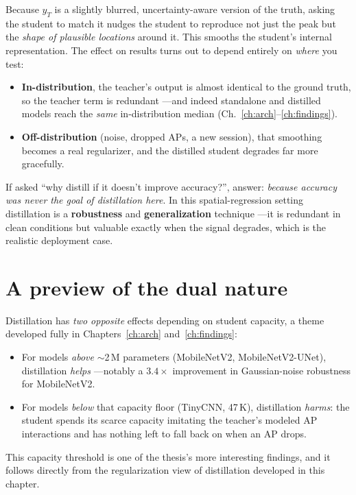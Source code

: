 Because $y_T$ is a slightly blurred, uncertainty-aware version of the truth, asking the student to
match it nudges the student to reproduce not just the peak but the \emph{shape of plausible
locations} around it. This smooths the student's internal representation. The effect on results turns
out to depend entirely on \emph{where} you test:
\begin{itemize}[leftmargin=1.4em,nosep]
  \item \textbf{In-distribution}, the teacher's output is almost identical to the ground truth, so the
  teacher term is redundant ---and indeed standalone and distilled models reach the \emph{same}
  in-distribution median (Ch.~\ref{ch:arch}--\ref{ch:findings}).
  \item \textbf{Off-distribution} (noise, dropped APs, a new session), that smoothing becomes a real
  regularizer, and the distilled student degrades far more gracefully.
\end{itemize}

\begin{defensetip}
If asked ``why distill if it doesn't improve accuracy?'', answer: \emph{because accuracy was never the
goal of distillation here}. In this spatial-regression setting distillation is a \textbf{robustness}
and \textbf{generalization} technique ---it is redundant in clean conditions but valuable exactly when
the signal degrades, which is the realistic deployment case.
\end{defensetip}

\section{A preview of the dual nature}
\label{sec:distill:dual}

Distillation has \emph{two opposite} effects depending on student capacity, a theme developed fully in
Chapters~\ref{ch:arch} and~\ref{ch:findings}:
\begin{itemize}[leftmargin=1.4em,nosep]
  \item For models \emph{above} $\sim$2\,M parameters (MobileNetV2, MobileNetV2-UNet), distillation
  \emph{helps} ---notably a $3.4\times$ improvement in Gaussian-noise robustness for MobileNetV2.
  \item For models \emph{below} that capacity floor (TinyCNN, 47\,K), distillation \emph{harms}: the
  student spends its scarce capacity imitating the teacher's modeled AP interactions and has nothing
  left to fall back on when an AP drops.
\end{itemize}
This capacity threshold is one of the thesis's more interesting findings, and it follows directly from
the regularization view of distillation developed in this chapter.

